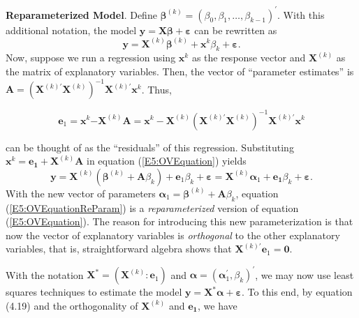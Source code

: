 \textbf{Reparameterized Model}. Define $\boldsymbol
\beta^{(k)}=(\beta_0,\beta_1,\ldots,\beta_{k-1})^{\prime}$. With
this additional notation, the model $\mathbf{y}=\mathbf{X\boldsymbol
\beta + \boldsymbol \varepsilon}$ can be rewritten as
\begin{equation}\label{E5:OVEquation}
\mathbf{y}=\mathbf{X}^{(k)}{\boldsymbol \beta
}^{(k)}+\mathbf{x}^{k}\beta_{k}+ \boldsymbol \varepsilon.
\end{equation}
Now, suppose we run a regression using $\mathbf{x}^{k}$ as the
response vector and $\mathbf{X}^{(k)}$ as the matrix of explanatory
variables. Then,
the vector of ``parameter estimates'' is $\mathbf{A}=\left( \mathbf{X}%
^{(k)\prime }\mathbf{X}^{(k)}\right) ^{-1}\mathbf{X}^{(k)\prime }\mathbf{x}%
^{k}$. Thus,
\begin{center}
\[
\mathbf{e}_1=\mathbf{x}^{k}\mathbf{-X}^{(k)}\mathbf{A}=\mathbf{x}%
^{k}-\mathbf{X}^{(k)}\left( \mathbf{X}^{(k)\prime
}\mathbf{X}^{(k)}\right) ^{-1}\mathbf{X}^{(k)\prime }\mathbf{x}^{k}
\]
\end{center}
can be thought of as the ``residuals'' of this regression. Substituting $%
\mathbf{x}^{k}=\mathbf{e_1}+\mathbf{X}^{(k)}\mathbf{A}$ in equation
(\ref{E5:OVEquation}) yields
\begin{equation}\label{E5:OVEquationReParam}
\mathbf{y}=\mathbf{X}^{(k)}(\mathbf{\beta }^{(k)}+\mathbf{A}\beta_{k})+%
\mathbf{e}_1 \beta_{k} + \boldsymbol \varepsilon = \mathbf{X}^{(k)}
\boldsymbol \alpha_1 + \mathbf{e_1} \beta_{k} + \boldsymbol
\varepsilon.
\end{equation}
With the new vector of parameters $\boldsymbol \alpha_1=\boldsymbol
\beta ^{(k)}+\mathbf{A}\beta_{k}$, equation
(\ref{E5:OVEquationReParam}) is a \textit{reparameterized} version
of equation (\ref{E5:OVEquation}). The reason for introducing this
new parameterization is that now the vector of explanatory variables
is \textit{orthogonal} to the other explanatory variables, that is,
straightforward algebra shows that $\mathbf{X}^{(k)\prime
}\mathbf{e}_1=\mathbf{0}$.

With the notation $\mathbf{X}^{\ast} = (\mathbf{X}^{(k)}:
\mathbf{e}_1)$ and $\boldsymbol \alpha = (\boldsymbol
\alpha_1^{\prime}, \beta_{k})^{\prime}$, we may now use least
squares techniques to estimate the model
$\mathbf{y}=\mathbf{X}^{\ast }\boldsymbol \alpha + \boldsymbol
\varepsilon$. To this end, by equation (4.19) and the orthogonality
of $\mathbf{X}^{(k)}$ and $\mathbf{e_1}$, we have

